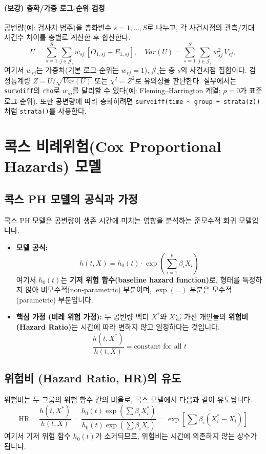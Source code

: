 \documentclass{article}
\begin{document}
\paragraph{(보강) 층화/가중 로그-순위 검정}
공변량(예: 검사치 범주)을 층화변수 $s=1,\dots,S$로 나누고, 각 사건시점의 관측/기대 사건수 차이를 층별로 계산한 후 합산한다.
\[
U = \sum_{s=1}^S \sum_{j \in \mathcal{J}_s} w_{sj}\,[O_{1,sj}-E_{1,sj}], 
\quad
Var(U)=\sum_{s=1}^S \sum_{j \in \mathcal{J}_s} w_{sj}^2\,V_{sj},
\]
여기서 $w_{sj}$는 가중치(기본 로그-순위는 $w_{sj}=1$), $\mathcal{J}_s$는 층 $s$의 사건시점 집합이다. 검정통계량 $Z=U/\sqrt{Var(U)}$ 또는 $\chi^2=Z^2$로 유의성을 판단한다. 
실무에서는 \texttt{survdiff}의 \texttt{rho}로 $w_{sj}$를 달리할 수 있다(예: Fleming--Harrington 계열; $\rho=0$가 표준 로그-순위).
또한 공변량에 따라 층화하려면 \texttt{survdiff(time \textasciitilde{} group + strata(z))}처럼 \texttt{strata()}를 사용한다.

\section{콕스 비례위험(Cox Proportional Hazards) 모델}

\subsection{콕스 PH 모델의 공식과 가정}
콕스 PH 모델은 공변량이 생존 시간에 미치는 영향을 분석하는 준모수적 회귀 모델입니다.

\begin{itemize}
    \item \textbf{모델 공식:}
    $$h(t, X) = h_0(t) \cdot \exp\left(\sum_{i=1}^{p} \beta_i X_i\right)$$
    여기서 $h_0(t)$는 \textbf{기저 위험 함수(baseline hazard function)}로, 형태를 특정하지 않아 비모수적(non-parametric) 부분이며, $\exp(\dots)$ 부분은 모수적(parametric) 부분입니다.

    \item \textbf{핵심 가정 (비례 위험 가정):} 두 공변량 벡터 $X^*$와 $X$를 가진 개인들의 \textbf{위험비(Hazard Ratio)}는 시간에 따라 변하지 않고 일정하다는 것입니다.
    $$\frac{h(t, X^*)}{h(t, X)} = \text{constant for all } t$$
\end{itemize}

\subsection{위험비 (Hazard Ratio, HR)의 유도}
위험비는 두 그룹의 위험 함수 간의 비율로, 콕스 모델에서 다음과 같이 유도됩니다.
$$\text{HR} = \frac{h(t, X^*)}{h(t, X)} = \frac{h_0(t) \exp(\sum \beta_i X_i^*)}{h_0(t) \exp(\sum \beta_i X_i)} = \exp\left[\sum \beta_i (X_i^* - X_i)\right]$$
여기서 기저 위험 함수 $h_0(t)$가 소거되므로, 위험비는 시간에 의존하지 않는 상수가 됩니다.
\end{document}
